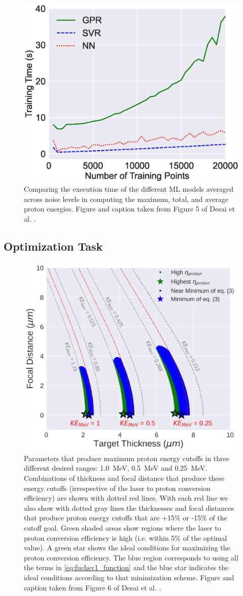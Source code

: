 \begin{figure}
	\centering 
	\includegraphics[width=0.6\linewidth]{planning/images/paper1/time.eps}
	\caption{Comparing the execution time of the different \gls{ML} models averaged across noise levels in computing the maximum, total, and average proton energies. Figure and caption taken from Figure 5 of Desai et al. \cite{Desai_2024_CPP}.}
	\label{fig:execution_time}
\end{figure}

\subsection{Optimization Task}
\begin{figure}
	\centering 
	\includegraphics[width=0.65\linewidth]{planning/images/paper1/fuchs_optim.pdf}
	\caption{Parameters that produce maximum proton energy cutoffs in three different desired ranges: 1.0~MeV, 0.5~MeV and 0.25~MeV. Combinations of thickness and focal distance that produce these energy cutoffs (irrespective of the laser to proton conversion efficiency) are shown with dotted red lines. With each red line we also show with dotted gray lines the thicknesses and focal distances that produce proton energy cutoffs that are +15\% or -15\% of the cutoff goal. Green shaded areas show regions where the laser to proton conversion efficiency is high (i.e. within 5\% of the optimal value). A green star shows the ideal conditions for maximizing the proton conversion efficiency. The blue region corresponds to using all the terms in \autoref{eq:fuchsv1_function} and the blue star indicates the ideal conditions according to that minimization scheme. Figure and caption taken from Figure 6 of Desai et al. \cite{Desai_2024_CPP}.}
	\label{fig:banana}
\end{figure}

